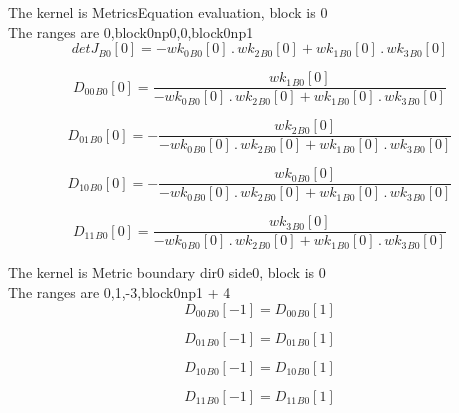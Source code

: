 \documentclass{article}
\begin{document}
\noindent The kernel is MetricsEquation evaluation, block is 0\\\noindent The ranges are 0,block0np0,0,block0np1\\\begin{dmath}{detJ{_{B0}}}[{0}] = - {wk_{0}{_{B0}}}[{0}] \,.\, {wk_{2}{_{B0}}}[{0}] + {wk_{1}{_{B0}}}[{0}] \,.\, {wk_{3}{_{B0}}}[{0}]\end{dmath}

\begin{dmath}{D_{00}{_{B0}}}[{0}] = \frac{{wk_{1}{_{B0}}}[{0}]}{- {wk_{0}{_{B0}}}[{0}] \,.\, {wk_{2}{_{B0}}}[{0}] + {wk_{1}{_{B0}}}[{0}] \,.\, {wk_{3}{_{B0}}}[{0}]}\end{dmath}

\begin{dmath}{D_{01}{_{B0}}}[{0}] = - \frac{{wk_{2}{_{B0}}}[{0}]}{- {wk_{0}{_{B0}}}[{0}] \,.\, {wk_{2}{_{B0}}}[{0}] + {wk_{1}{_{B0}}}[{0}] \,.\, {wk_{3}{_{B0}}}[{0}]}\end{dmath}

\begin{dmath}{D_{10}{_{B0}}}[{0}] = - \frac{{wk_{0}{_{B0}}}[{0}]}{- {wk_{0}{_{B0}}}[{0}] \,.\, {wk_{2}{_{B0}}}[{0}] + {wk_{1}{_{B0}}}[{0}] \,.\, {wk_{3}{_{B0}}}[{0}]}\end{dmath}

\begin{dmath}{D_{11}{_{B0}}}[{0}] = \frac{{wk_{3}{_{B0}}}[{0}]}{- {wk_{0}{_{B0}}}[{0}] \,.\, {wk_{2}{_{B0}}}[{0}] + {wk_{1}{_{B0}}}[{0}] \,.\, {wk_{3}{_{B0}}}[{0}]}\end{dmath}

\noindent The kernel is Metric boundary dir0 side0, block is 0\\\noindent The ranges are 0,1,-3,block0np1 + 4\\\begin{dmath}{D_{00}{_{B0}}}[{-1}] = {D_{00}{_{B0}}}[{1}]\end{dmath}

\begin{dmath}{D_{01}{_{B0}}}[{-1}] = {D_{01}{_{B0}}}[{1}]\end{dmath}

\begin{dmath}{D_{10}{_{B0}}}[{-1}] = {D_{10}{_{B0}}}[{1}]\end{dmath}

\begin{dmath}{D_{11}{_{B0}}}[{-1}] = {D_{11}{_{B0}}}[{1}]\end{dmath}
\end{document}
